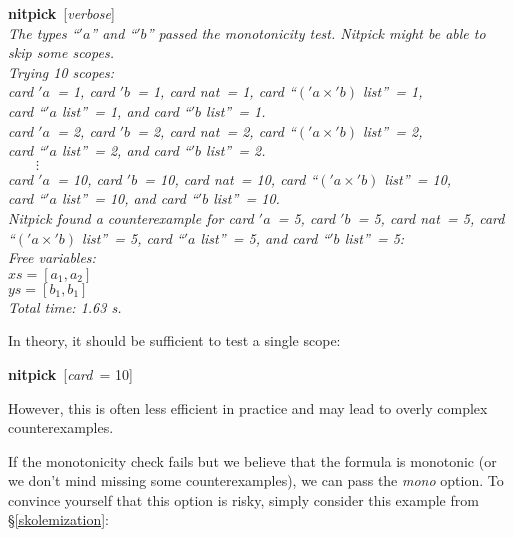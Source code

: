 \documentclass[a4paper,12pt]{article}
\begin{document}
\prew
\textbf{nitpick}~[\textit{verbose}] \\[2\smallskipamount]
\slshape
The types ``\kern1pt$'a$'' and ``\kern1pt$'b$'' passed the monotonicity test.
Nitpick might be able to skip some scopes.
 \\[2\smallskipamount]
Trying 10 scopes: \\
\hbox{}\qquad \textit{card} $'a$~= 1, \textit{card} $'b$~= 1,
\textit{card} \textit{nat}~= 1, \textit{card} ``$('a \times {'}b)$
\textit{list\/}''~= 1, \\
\hbox{}\qquad\quad \textit{card} ``\kern1pt$'a$ \textit{list\/}''~= 1, and
\textit{card} ``\kern1pt$'b$ \textit{list\/}''~= 1. \\
\hbox{}\qquad \textit{card} $'a$~= 2, \textit{card} $'b$~= 2,
\textit{card} \textit{nat}~= 2, \textit{card} ``$('a \times {'}b)$
\textit{list\/}''~= 2, \\
\hbox{}\qquad\quad \textit{card} ``\kern1pt$'a$ \textit{list\/}''~= 2, and
\textit{card} ``\kern1pt$'b$ \textit{list\/}''~= 2. \\
\hbox{}\qquad $\qquad\vdots$ \\[.5\smallskipamount]
\hbox{}\qquad \textit{card} $'a$~= 10, \textit{card} $'b$~= 10,
\textit{card} \textit{nat}~= 10, \textit{card} ``$('a \times {'}b)$
\textit{list\/}''~= 10, \\
\hbox{}\qquad\quad \textit{card} ``\kern1pt$'a$ \textit{list\/}''~= 10, and
\textit{card} ``\kern1pt$'b$ \textit{list\/}''~= 10.
\\[2\smallskipamount]
Nitpick found a counterexample for
\textit{card} $'a$~= 5, \textit{card} $'b$~= 5,
\textit{card} \textit{nat}~= 5, \textit{card} ``$('a \times {'}b)$
\textit{list\/}''~= 5, \textit{card} ``\kern1pt$'a$ \textit{list\/}''~= 5, and
\textit{card} ``\kern1pt$'b$ \textit{list\/}''~= 5:
\\[2\smallskipamount]
\hbox{}\qquad Free variables: \nopagebreak \\
\hbox{}\qquad\qquad $\textit{xs} = [a_1, a_2]$ \\
\hbox{}\qquad\qquad $\textit{ys} = [b_1, b_1]$ \\[2\smallskipamount]
Total time: 1.63 s.
\postw

In theory, it should be sufficient to test a single scope:

\prew
\textbf{nitpick}~[\textit{card}~= 10]
\postw

However, this is often less efficient in practice and may lead to overly complex
counterexamples.

If the monotonicity check fails but we believe that the formula is monotonic (or
we don't mind missing some counterexamples), we can pass the
\textit{mono} option. To convince yourself that this option is risky,
simply consider this example from \S\ref{skolemization}:
\end{document}
